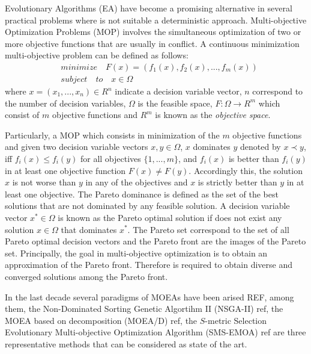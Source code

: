 Evolutionary Algorithms (EA) have become a promising alternative in several practical problems where is not suitable a deterministic approach.
%
Multi-objective Optimization Problems (MOP) involves the simultaneous optimization of two or more objective functions that are usually in conflict.
%
A continuous minimization multi-objective problem can be defined as follows:
%
\begin{equation}\label{Base}
\begin{split}
&minimize \quad F(x) = (f_1(x), f_2(x), ..., f_m(x)) \\
&subject \quad to \quad x \in \Omega
\end{split}
\end{equation}
where $x = (x_1, ..., x_n) \in R^n$ indicate a decision variable vector, $n$ correspond to the number of decision variables, $\Omega$ is the feasible space, $F: \Omega \rightarrow R^m$ which consist of $m$ objective functions and $R^m$ is known as the \textit{objective space}.
%

Particularly, a MOP which consists in minimization of the $m$ objective functions and given two decision variable vectors $x, y \in \Omega$, $x$ dominates $y$ denoted by $x \prec y$, iff $f_i(x)  \leq f_i(y)$ for all objectives $\{1,...,m\}$, and $f_i(x)$ is better than $f_i(y)$ in at least one objective function $F(x) \neq F(y)$.
%
Accordingly this, the solution $x$ is not worse than $y$ in any of the objectives and $x$ is strictly better than $y$ in at least one objective.
%
The Pareto dominance is defined as the set of the best solutions that are not dominated by any feasible solution.
%
A decision variable vector $x^* \in \Omega$ is known as the Pareto optimal solution if does not exist any solution $x \in \Omega$ that dominates $x^*$.
%
The Pareto set correspond to the set of all Pareto optimal decision vectors and the Pareto front are the images of the Pareto set.
%
Principally, the goal in multi-objective optimization is to obtain an approximation of the Pareto front.
%
Therefore is required to obtain diverse and converged solutions among the Pareto front.
%

In the last decade several paradigms of MOEAs have been arised REF, among them, the Non-Dominated Sorting Genetic Algortihm II (NSGA-II) ref, the MOEA based on decomposition (MOEA/D) ref, the $S$-metric Selection Evolutionary Multi-objective Optimization Algorithm (SMS-EMOA) ref are three representative methods that can be considered as state of the art.

